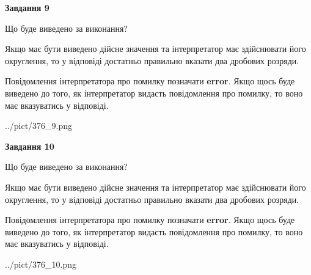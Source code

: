 \documentclass[12pt, ukrainian]{article}
\begin{document}
{\begin {Large}
{\begin {center}\textbf{Завдання 9}\end {center}}\par
Що буде виведено за виконання? \par

Якщо має бути виведено дійсне значення та інтерпретатор має здійснювати його округлення, 
то у відповіді достатньо правильно вказати два дробових розряди.

Повідомлення інтерпретатора про помилку позначати \textbf{error}.
Якщо щось буде виведено до того, як інтерпретатор видасть повідомлення про помилку, 
то воно має вказуватись у відповіді. \par

\begin{center}
	{../pict/376_9.png}
\end{center}
\newpage

{\begin {center}\textbf{Завдання 10}\end {center}}\par
Що буде виведено за виконання? \par

Якщо має бути виведено дійсне значення та інтерпретатор має здійснювати його округлення, 
то у відповіді достатньо правильно вказати два дробових розряди.

Повідомлення інтерпретатора про помилку позначати \textbf{error}.
Якщо щось буде виведено до того, як інтерпретатор видасть повідомлення про помилку, 
то воно має вказуватись у відповіді. \par

\begin{center}
	{../pict/376_10.png}
\end{center}
\newpage

\end {Large}}
\end{document}
